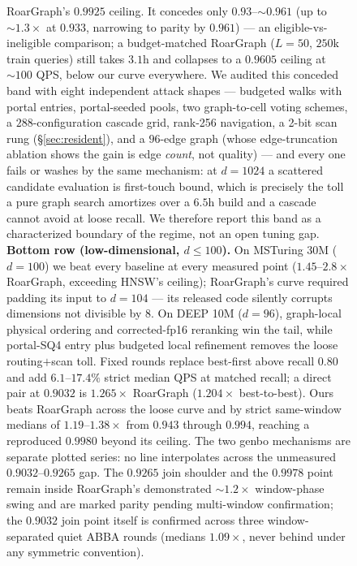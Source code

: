 \documentclass{article}
\begin{document}
\begin{figure}[tp]
{  RoarGraph's $0.9925$ ceiling. It concedes only
  $0.93$--${\sim}0.961$ (up to ${\sim}1.3\times$ at $0.933$, narrowing to
  parity by $0.961$) --- an eligible-vs-ineligible comparison; a
  budget-matched RoarGraph ($L{=}50$, $250$k train queries) still takes $3.1$h and
  collapses to a $0.9605$ ceiling at ${\sim}100$ QPS, below our curve everywhere.
  We audited this conceded band with eight independent attack shapes ---
  budgeted walks with portal entries, portal-seeded pools, two graph-to-cell
  voting schemes, a $288$-configuration cascade grid, rank-256 navigation,
  a 2-bit scan rung (\S\ref{sec:resident}), and a $96$-edge graph (whose
  edge-truncation ablation shows the gain is edge \emph{count}, not quality) ---
  and every one fails or washes by the same mechanism: at $d{=}1024$ a scattered
  candidate evaluation is first-touch bound, which is precisely the toll a pure
  graph search amortizes over a $6.5$h build and a cascade cannot avoid at loose
  recall. We therefore report this band as a characterized boundary of the
  regime, not an open tuning gap. \textbf{Bottom row (low-dimensional, $d{\le}100$).} On MSTuring 30M
  ($d{=}100$) we beat every baseline at every measured point ($1.45$--$2.8\times$
  RoarGraph, exceeding HNSW's ceiling); RoarGraph's curve required padding its input
  to $d{=}104$ --- its released code silently corrupts dimensions not divisible by 8.
  On DEEP 10M ($d{=}96$), graph-local physical ordering and corrected-fp16
  reranking win the tail, while portal-SQ4 entry plus budgeted local refinement
  removes the loose routing$+$scan toll. Fixed rounds replace best-first above
  recall $0.80$ and add $6.1$--$17.4\%$ strict median QPS at matched recall;
  a direct pair at $0.9032$ is $1.265\times$ RoarGraph ($1.204\times$
  best-to-best). Ours beats RoarGraph across the loose curve and by strict
  same-window medians of $1.19$--$1.38\times$ from $0.943$ through $0.994$,
  reaching a reproduced $0.9980$ beyond its ceiling. The two genbo mechanisms
  are separate plotted series: no line interpolates across the unmeasured
  $0.9032$--$0.9265$ gap. The $0.9265$ join shoulder and the
  $0.9978$ point remain inside RoarGraph's demonstrated ${\sim}1.2\times$
  window-phase swing and are marked parity pending multi-window confirmation; the $0.9032$ join point itself is confirmed across three window-separated quiet ABBA rounds (medians $1.09\times$, never behind under any symmetric convention).}
  \label{fig:frontier}
\end{figure}
\end{document}
